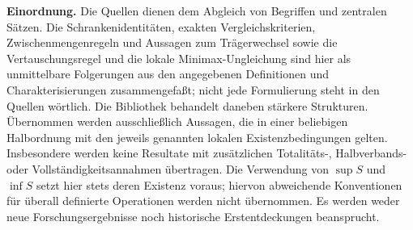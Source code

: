 \begingroup
\footnotesize
\noindent\textbf{Einordnung.}
Die Quellen dienen dem Abgleich von Begriffen und zentralen Sätzen.
Die Schrankenidentitäten, exakten Vergleichskriterien,
Zwischenmengenregeln und Aussagen zum Trägerwechsel sowie die
Vertauschungsregel und die lokale Minimax-Ungleichung sind hier
als unmittelbare Folgerungen aus den angegebenen Definitionen
und Charakterisierungen zusammengefaßt; nicht jede Formulierung
steht in den Quellen wörtlich. Die Bibliothek behandelt daneben
stärkere Strukturen. Übernommen werden ausschließlich Aussagen,
die in einer beliebigen Halbordnung mit den jeweils genannten
lokalen Existenzbedingungen gelten. Insbesondere werden keine
Resultate mit zusätzlichen Totalitäts-, Halbverbands- oder
Vollständigkeitsannahmen übertragen. Die Verwendung von $\sup S$
und $\inf S$ setzt hier stets deren Existenz voraus; hiervon
abweichende Konventionen für überall definierte Operationen
werden nicht übernommen. Es werden weder neue Forschungsergebnisse
noch historische Erstentdeckungen beansprucht.
\endgroup
